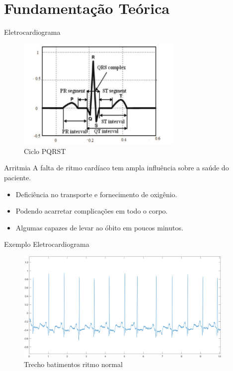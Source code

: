 \documentclass[10pt]{beamer}
\begin{document}
\section{Fundamentação Teórica}

\begin{frame}{Eletrocardiograma}
    \begin{figure}[]
      \centering
      \includegraphics[width=8cm]{images/pqrst.png}
      \caption{Ciclo PQRST \cite{faziludeen_ecg_2013}}
      \label{fig:pqrst}
    \end{figure}
\end{frame}

\begin{frame}{Arritmia}
  A falta de ritmo cardíaco tem ampla influência sobre a saúde do paciente.
    \begin{itemize}
      \item Deficiência no transporte e fornecimento de oxigênio.
      \item Podendo acarretar complicações em todo o corpo.
      \item Algumas capazes de levar ao óbito em poucos minutos.
    \end{itemize}
\end{frame}

\begin{frame}{Exemplo Eletrocardiograma}
  \begin{figure}
    \includegraphics[width=10.5cm]{images/normal.png}
    \caption{Trecho batimentos ritmo normal}
  \end{figure}

\end{frame}
\end{document}
